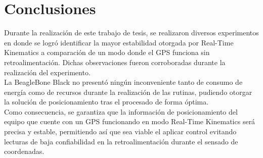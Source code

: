 
\chapter{Conclusiones} %

\label{Conc} %

Durante la realización de este trabajo de tesis, se realizaron diversos experimentos en donde se logró identificar la mayor estabilidad otorgada por Real-Time Kinematics a comparación de un modo donde el GPS funciona sin retroalimentación. Dichas observaciones fueron corroboradas durante la realización del experimento.\\

La BeagleBone Black no presentó ningún inconveniente tanto de consumo de energía como de recursos durante la realización de las rutinas, pudiendo otorgar la solución de posicionamiento tras el procesado de forma óptima.\\

Como consecuencia, se garantiza que la información de posicionamiento del equipo que cuente con un GPS funcionando en modo Real-Time Kinematics será precisa y estable, permitiendo así que sea viable el aplicar control evitando lecturas de baja confiabilidad en la retroalimentación durante el sensado de coordenadas.